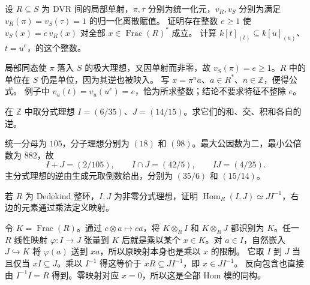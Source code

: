 \begin{exercise}\label{b3:ex:10-ramification-basic}
	设 \(R\subseteq S\) 为 DVR 间的局部单射，\(\pi,\tau\) 分别为统一化元，\(v_R,v_S\) 分别为满足 \(v_R(\pi)=v_S(\tau)=1\) 的归一化离散赋值。 证明存在整数 \(e\ge1\) 使 \(v_S(x)=e\,v_R(x)\) 对全部 \(x\in\operatorname{Frac}(R)^*\) 成立。 计算 \(k[t]_{(t)}\subseteq k[u]_{(u)}\)、\(t=u^e\)，的这个整数。
\end{exercise}
\begin{solution}
	局部同态使 \(\pi\) 落入 \(S\) 的极大理想，又因单射而非零，故 \(v_S(\pi)=e\ge1\)。\(R\) 中的单位在 \(S\) 仍是单位，因为其逆也被映入。 写 \(x=\pi^n a\)、\(a\in R^*\)、\(n\in\mathbb Z\)，便得公式。 例子中 \(v_u(t)=v_u(u^e)=e\)，恰为所求整数；结论不要求特征不整除 \(e\)。
\end{solution}

\begin{exercise}\label{b3:ex:10-fractional-integers}
	在 \(\mathbb Z\) 中取分式理想 \(I=(6/35)\)、\(J=(14/15)\)。求它们的和、交、积和各自的逆。
\end{exercise}
\begin{solution}
	统一分母为 \(105\)，分子理想分别为 \((18)\) 和 \((98)\)。最大公因数为二，最小公倍数为 \(882\)，故
	\[
		I+J=(2/105),\qquad I\cap J=(42/5),\qquad IJ=(4/25).
	\]
	主分式理想的逆由生成元取倒数给出，分别为 \((35/6)\) 和 \((15/14)\)。
\end{solution}

\begin{exercise}\label{b3:ex:10-hom-fractional}
	若 \(R\) 为 Dedekind 整环，\(I,J\) 为非零分式理想，证明 \(\operatorname{Hom}_R(I,J)\simeq JI^{-1}\)，右边的元素通过乘法定义映射。
\end{exercise}
\begin{solution}
	令 \(K=\operatorname{Frac}(R)\)。通过 \(c\otimes a\mapsto ca\)，将 \(K\otimes_R I\) 和 \(K\otimes_R J\) 都识别为 \(K\)。任一 \(R\) 线性映射 \(\varphi:I\to J\) 张量到 \(K\) 后就是乘以某个 \(x\in K\)。对 \(a\in I\)，自然嵌入 \(J\hookrightarrow K\) 将 \(\varphi(a)\) 送到 \(x a\)，所以原映射本身也是乘以 \(x\) 的限制。 它取 \(I\) 到 \(J\) 当且仅当 \(xI\subseteq J\)。乘以 \(I^{-1}\) 得这等价于 \(xR\subseteq JI^{-1}\)，即 \(x\in JI^{-1}\)。 反向包含也直接由 \(I^{-1}I=R\) 得到。零映射对应 \(x=0\)，所以这是全部 Hom 模的同构。
\end{solution}


